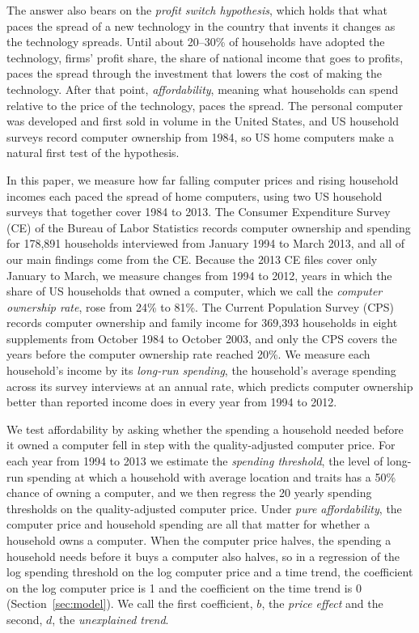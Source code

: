 \documentclass[11pt]{article}
\begin{document}
The answer also bears on the \emph{profit switch hypothesis}, which holds that what paces the spread of a new technology in the country that invents it changes as the technology spreads. Until about 20--30\% of households have adopted the technology, firms' profit share, the share of national income that goes to profits, paces the spread through the investment that lowers the cost of making the technology. After that point, \emph{affordability}, meaning what households can spend relative to the price of the technology, paces the spread. The personal computer was developed and first sold in volume in the United States, and US household surveys record computer ownership from 1984, so US home computers make a natural first test of the hypothesis.

In this paper, we measure how far falling computer prices and rising household incomes each paced the spread of home computers, using two US household surveys that together cover 1984 to 2013. The Consumer Expenditure Survey (CE) of the Bureau of Labor Statistics records computer ownership and spending for 178{,}891 households interviewed from January 1994 to March 2013, and all of our main findings come from the CE. Because the 2013 CE files cover only January to March, we measure changes from 1994 to 2012, years in which the share of US households that owned a computer, which we call the \emph{computer ownership rate}, rose from 24\% to 81\%. The Current Population Survey (CPS) records computer ownership and family income for 369{,}393 households in eight supplements from October 1984 to October 2003, and only the CPS covers the years before the computer ownership rate reached 20\%. We measure each household's income by its \emph{long-run spending}, the household's average spending across its survey interviews at an annual rate, which predicts computer ownership better than reported income does in every year from 1994 to 2012.

We test affordability by asking whether the spending a household needed before it owned a computer fell in step with the quality-adjusted computer price. For each year from 1994 to 2013 we estimate the \emph{spending threshold}, the level of long-run spending at which a household with average location and traits has a 50\% chance of owning a computer, and we then regress the 20 yearly spending thresholds on the quality-adjusted computer price. Under \emph{pure affordability}, the computer price and household spending are all that matter for whether a household owns a computer. When the computer price halves, the spending a household needs before it buys a computer also halves, so in a regression of the log spending threshold on the log computer price and a time trend, the coefficient on the log computer price is 1 and the coefficient on the time trend is 0 (Section~\ref{sec:model}). We call the first coefficient, $b$, the \emph{price effect} and the second, $d$, the \emph{unexplained trend}.
\end{document}
